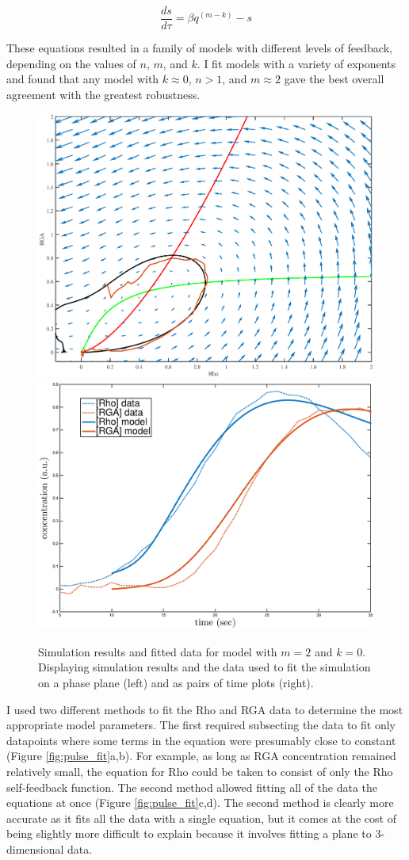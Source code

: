 \begin{equation}
	\frac{ds}{d\tau} = \beta q^{(m-k)} - s
\end{equation}

These equations resulted in a family of models with different levels of feedback, depending on the values of $n$, $m$, and $k$.  I fit models with a variety of exponents and found that any model with $k\approx0$, $n>1$, and $m\approx2$ gave the best overall agreement with the greatest robustness.  
\begin{figure}[h!]
	\centering
	\includegraphics[width=0.45\hsize]{pulse/simple_model_fit_phase.eps}
	\includegraphics[width=0.45\hsize]{pulse/model_profile.eps}
	\caption[Simulation results and fitted data for model with $m=2$ and $k=0$.]{\label{fig:pulse_fit_sim}  Simulation results and fitted data for model with $m=2$ and $k=0$. Displaying simulation results and the data used to fit the simulation on a phase plane (left) and as pairs of time plots (right).}
\end{figure}
I used two different methods to fit the Rho and RGA data to determine the most appropriate model parameters.  The first required subsecting the data to fit only datapoints where some terms in the equation were presumably close to constant (Figure \ref{fig:pulse_fit}a,b).  For example, as long as RGA concentration remained relatively small, the equation for Rho could be taken to consist of only the Rho self-feedback function.  The second method allowed fitting all of the data the equations at once (Figure \ref{fig:pulse_fit}c,d).  The second method is clearly more accurate as it fits all the data with a single equation, but it comes at the cost of being slightly more difficult to explain because it involves fitting a plane to 3-dimensional data.

